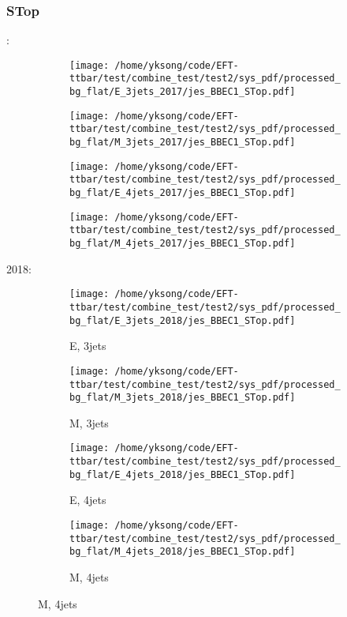 \documentclass{beamer}
\begin{document}
\begin{frame}
\frametitle{STop}
\fontsize{5}{1}:
\begin{figure}
\centering
\begin{subfigure}[b]{0.24\textwidth}
\texttt{[image: /home/yksong/code/EFT-ttbar/test/combine\_test/test2/sys\_pdf/processed\_bg\_flat/E\_3jets\_2017/jes\_BBEC1\_STop.pdf]}
\end{subfigure}
\begin{subfigure}[b]{0.24\textwidth}
\texttt{[image: /home/yksong/code/EFT-ttbar/test/combine\_test/test2/sys\_pdf/processed\_bg\_flat/M\_3jets\_2017/jes\_BBEC1\_STop.pdf]}
\end{subfigure}
\begin{subfigure}[b]{0.24\textwidth}
\texttt{[image: /home/yksong/code/EFT-ttbar/test/combine\_test/test2/sys\_pdf/processed\_bg\_flat/E\_4jets\_2017/jes\_BBEC1\_STop.pdf]}
\end{subfigure}
\begin{subfigure}[b]{0.24\textwidth}
\texttt{[image: /home/yksong/code/EFT-ttbar/test/combine\_test/test2/sys\_pdf/processed\_bg\_flat/M\_4jets\_2017/jes\_BBEC1\_STop.pdf]}
\end{subfigure}
\end{figure}
2018:
\begin{figure}
\centering
\begin{subfigure}[b]{0.24\textwidth}
\texttt{[image: /home/yksong/code/EFT-ttbar/test/combine\_test/test2/sys\_pdf/processed\_bg\_flat/E\_3jets\_2018/jes\_BBEC1\_STop.pdf]}
\captionsetup{font=tiny}
\caption{E, 3jets}
\end{subfigure}
\begin{subfigure}[b]{0.24\textwidth}
\texttt{[image: /home/yksong/code/EFT-ttbar/test/combine\_test/test2/sys\_pdf/processed\_bg\_flat/M\_3jets\_2018/jes\_BBEC1\_STop.pdf]}
\captionsetup{font=tiny}
\caption{M, 3jets}
\end{subfigure}
\begin{subfigure}[b]{0.24\textwidth}
\texttt{[image: /home/yksong/code/EFT-ttbar/test/combine\_test/test2/sys\_pdf/processed\_bg\_flat/E\_4jets\_2018/jes\_BBEC1\_STop.pdf]}
\captionsetup{font=tiny}
\caption{E, 4jets}
\end{subfigure}
\begin{subfigure}[b]{0.24\textwidth}
\texttt{[image: /home/yksong/code/EFT-ttbar/test/combine\_test/test2/sys\_pdf/processed\_bg\_flat/M\_4jets\_2018/jes\_BBEC1\_STop.pdf]}
\captionsetup{font=tiny}
\caption{M, 4jets}
\end{subfigure}
\end{figure}
\end{frame}
\end{document}
